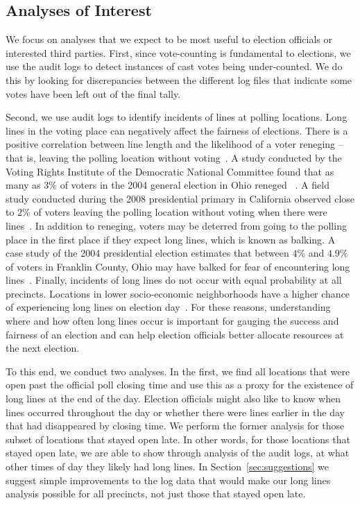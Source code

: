 \documentclass[letterpaper,twocolumn,10pt]{article}
\begin{document}
\subsection{Analyses of Interest}
We focus on analyses that we expect to be most useful to election officials or
interested third parties. First, since vote-counting is fundamental to
elections, we use the audit logs to detect instances of cast votes being
under-counted. We do this by looking for discrepancies between the
different log files that indicate some votes have been left out of the final
tally. 

Second, we use audit logs to identify incidents of lines at polling
locations. Long lines in the voting place can
negatively affect the fairness of elections. There is a positive correlation
between line length and the likelihood of a voter reneging -- that is, leaving
the polling location without voting~\cite{Spencer2010}. A study conducted by the
Voting Rights Institute of the Democratic National Committee found that as many
as $3\%$ of voters in the 2004 general election in Ohio reneged
~\cite{DNC2005}. A field study conducted 
during the 2008 presidential primary in California observed close to $2\%$
of voters leaving the polling location without voting when there were
lines~\cite{Spencer2010}. In addition to reneging, voters may be deterred from
going to the polling place in the first place if they expect long lines, which is
known as balking. A case study of the 2004 presidential election estimates that
between $4\%$ and $4.9\%$ of voters in Franklin County, Ohio may have balked for
fear of encountering long lines~\cite{Allen2006}. Finally, incidents of long
lines do not occur with equal probability at all precincts. Locations in lower
socio-economic neighborhoods have a higher chance of experiencing long lines on
election day~\cite{Spencer2010,DNC2005}. For these reasons, understanding where  
and how often long lines occur is important for gauging the success and fairness
of an election and can help election officials better allocate resources at the
next election. 

To this end, we conduct two analyses. In the first, we find all
locations that were open past the official poll closing time and use this as a
proxy for the existence of long lines at the end of the day. Election officials
might also like to know when lines occurred throughout the day or whether there
were lines earlier in the day that had disappeared by closing time. We perform
the former 
analysis for those subset of locations that stayed open late. In other words,
for those locations that stayed open late, we are able to show through analysis
of the audit logs, at what other times of day they likely had long
lines. In Section~\ref{sec:suggestions} we suggest simple improvements to the log
data that would make our long lines analysis possible for all precincts, not
just those that stayed open late.
\end{document}
